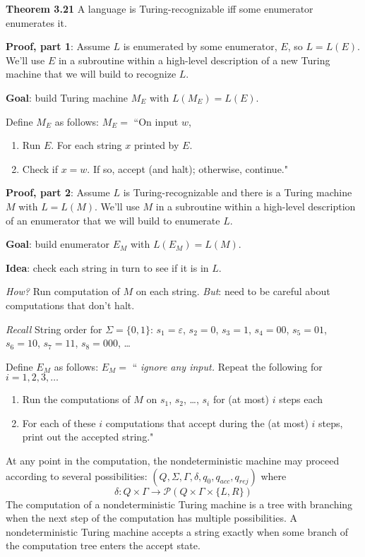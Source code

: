 \documentclass[12pt, oneside]{article}
\begin{document}
{\bf Theorem 3.21} A language is Turing-recognizable iff some enumerator enumerates it.

{\bf Proof, part 1}: Assume $L$ is enumerated by some enumerator, $E$, so $L = L(E)$. We'll use $E$ in a subroutine
within a high-level description of a new Turing machine that we will build to recognize $L$.

{\bf Goal}: build Turing machine $M_E$ with $L(M_E) = L(E)$.

Define $M_E$ as follows: $M_E = $ ``On input $w$,
\begin{enumerate}
\item Run $E$. For each string $x$ printed by $E$.
\item \qquad Check if $x = w$. If so, accept (and halt); otherwise, continue."
\end{enumerate}

{\bf Proof, part 2}: Assume $L$ is Turing-recognizable and there 
is a Turing  machine  $M$ with  $L = L(M)$. We'll use $M$ in a subroutine
within a high-level description of an enumerator that we will build to enumerate $L$.

{\bf Goal}: build enumerator $E_M$ with $L(E_M) = L(M)$.

{\bf Idea}: check each string in turn to see if it is in $L$.

{\it How?} Run computation of $M$ on each string.  {\it But}: need to be careful 
about computations that don't halt.

{\it Recall} String order for $\Sigma = \{0,1\}$: $s_1 = \varepsilon$, $s_2 = 0$, $s_3 = 1$, $s_4 = 00$, $s_5 = 01$, $s_6  = 10$, 
$s_7  =  11$, $s_8 = 000$, \ldots

Define $E_M$ as follows: $E_{M} = $ `` {\it ignore any input.} Repeat the following for $i=1, 2, 3, \ldots$
\begin{enumerate}
  \item Run the computations of $M$ on $s_1$, $s_2$, \ldots, $s_i$ for (at most) $i$ steps each
  \item For each of these $i$ computations that accept during the (at most) $i$ steps, print
  out the accepted string."
\end{enumerate}

\vfill


At any point in the computation, the nondeterministic machine may proceed according to 
several possibilities: $(Q, \Sigma, \Gamma, \delta, q_0, q_{acc}, q_{rej})$ where 
\[
\delta: Q \times \Gamma \to \mathcal{P}(Q \times \Gamma \times \{L, R\})  
\]
The computation of a nondeterministic Turing machine is a tree with branching
when the next step of the computation has multiple possibilities. A nondeterministic
Turing machine accepts a string exactly when some branch of the computation tree 
enters the accept state.
\end{document}
